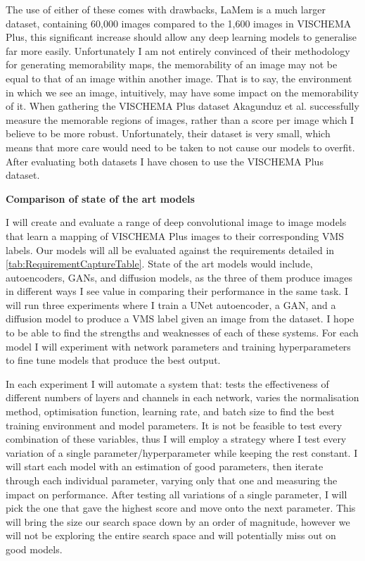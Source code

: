 \documentclass{UoYCSproject}
\begin{document}
The use of either of these comes with drawbacks, LaMem is a much larger dataset, containing 60,000 images compared to the 1,600 images in VISCHEMA Plus, this significant increase should allow any deep learning models to generalise far more easily. Unfortunately I am not entirely convinced of their methodology for generating memorability maps, the memorability of an image may not be equal to that of an image within another image. That is to say, the environment in which we see an image, intuitively, may have some impact on the memorability of it.
When gathering the VISCHEMA Plus dataset  Akagunduz et al. successfully measure the memorable regions of images, rather than a score per image which I believe to be more robust. Unfortunately, their dataset is very small, which means that more care would need to be taken to not cause our models to overfit. After evaluating both datasets I have chosen to use the VISCHEMA Plus dataset. 

\textbf{Comparison of state of the art models}

I will create and evaluate a range of deep convolutional image to image models that learn a mapping of VISCHEMA Plus images to their corresponding VMS labels. Our models will all be evaluated against the requirements detailed in \ref{tab:RequirementCaptureTable}. State of the art models would include, autoencoders, GANs, and diffusion models, as the three of them produce images in different ways I see value in comparing their performance in the same task. I will run three experiments where I train a UNet autoencoder, a GAN, and a diffusion model to produce a VMS label given an image from the dataset. I hope to be able to find the strengths and weaknesses of each of these systems. For each model I will experiment with network parameters and training hyperparameters to fine tune models that produce the best output.

In each experiment I will automate a system that: tests the effectiveness of different numbers of layers and channels in each network, varies the normalisation method, optimisation function, learning rate, and batch size to find the best training environment and model parameters. It is not be feasible to test every combination of these variables, thus I will employ a strategy where I test every variation of a single parameter/hyperparameter while keeping the rest constant. I will start each model with an estimation of good parameters, then iterate through each individual parameter, varying only that one and measuring the impact on performance. After testing all variations of a single parameter, I will pick the one that gave the highest score and move onto the next parameter. This will bring the size our search space down by an order of magnitude, however we will not be exploring the entire search space and will potentially miss out on good models. 
\end{document}
